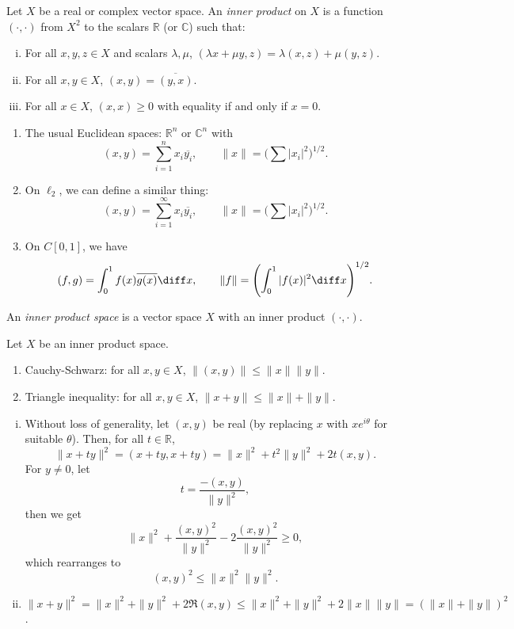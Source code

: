 \documentclass[12pt]{article}
\begin{document}
Let $X$ be a real or complex vector space. An \emph{inner product} on $X$ is a function $(\cdot, \cdot)$ from $X^2$ to the scalars $\mathbb{R}$ (or $\mathbb{C}$) such that:
\begin{enumerate}[(i)]
	\item For all $x, y, z \in X$ and scalars $\lambda, \mu$, $(\lambda x + \mu y, z) = \lambda (x, z) + \mu(y, z)$.
	\item For all $x, y \in X$, $(x, y) = \overline{(y, x)}$.
	\item For all $x \in X$, $(x, x) \geq 0$ with equality if and only if $x = 0$.
\end{enumerate}

\begin{exbox}
	\begin{enumerate}
		\item The usual Euclidean spaces: $\mathbb{R}^{n}$ or $\mathbb{C}^{n}$ with
			\[
				(x, y) = \sum_{i = 1}^{n} x_i \overline{y_i}, \qquad \|x\| = \Biggl( \sum |x_i|^2 \Biggr)^{1/2}.
			\]
		\item On $\ell_2$, we can define a similar thing:
			\[
				(x, y) = \sum_{i = 1}^{\infty} x_i \overline{y_i}, \qquad \|x\| = \Biggl( \sum |x_i|^2 \Biggr)^{1/2}.
			\]
		\item On $C[0,1]$, we have
			\[
				(f, g) = \int_0^1 f(x) \overline{g(x)} \diff x, \qquad \|f\| = \Biggl( \int_0^1 |f(x)|^2 \diff x \Biggr)^{1/2}.
			\]			
	\end{enumerate}
\end{exbox}

An \emph{inner product space} is a vector space $X$ with an inner product $(\cdot, \cdot)$.

\begin{proposition}
	Let $X$ be an inner product space.
	\begin{enumerate}[\normalfont(i)]
		\item Cauchy-Schwarz: for all $x, y \in X$, $\|(x, y)\| \leq \|x\|\|y\|$.
		\item Triangle inequality: for all $x, y \in X$, $\|x+y\| \leq \|x\| + \|y\|$.
	\end{enumerate}
\end{proposition}

\begin{proofbox}
	\begin{enumerate}[(i)]
		\item Without loss of generality, let $(x, y)$ be real (by replacing $x$ with $x e^{i \theta}$ for suitable $\theta$). Then, for all $t \in \mathbb{R}$,
			\[
			\|x+ty\|^2 = (x+ty, x+ty) = \|x\|^2 + t^2 \|y\|^2 + 2t(x, y).
			\]
			For $y \neq 0$, let
			\[
			t = \frac{-(x, y)}{\|y\|^2},
			\]
			then we get
			\[
			\|x\|^2 + \frac{(x, y)^2}{\|y\|^2} - 2 \frac{(x, y)^2}{\|y\|^2} \geq 0,
			\]
			which rearranges to 
			\[
				(x, y)^2 \leq \|x\|^2 \|y\|^2.
			\]
		\item $\|x+y\|^2 = \|x\|^2 + \|y\|^2 + 2 \Re (x, y) \leq \|x\|^2 + \|y\|^2 + 2\|x\|\|y\| = (\|x\| + \|y\|)^2$.
	\end{enumerate}
\end{proofbox}
\end{document}
